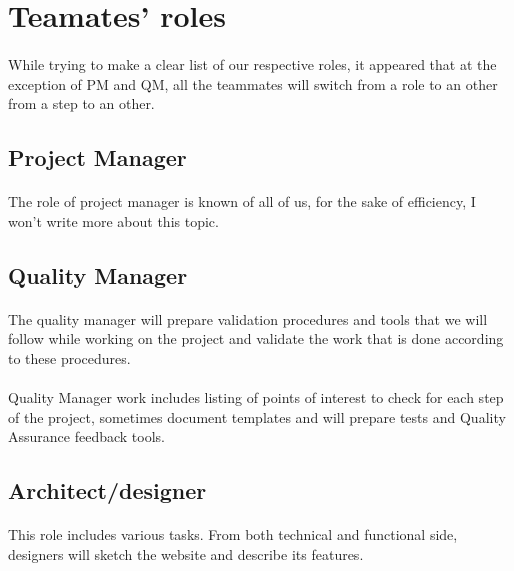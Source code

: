 \section{Teamates' roles}

\paragraph{} While trying to make a clear list of our respective roles, it
appeared that at the exception of PM and QM, all the teammates will switch from a
role to an other from a step to an other.

\subsection{Project Manager}

\paragraph{} The role of project manager is known of all of us, for the sake of
efficiency, I won't write more about this topic.

\subsection{Quality Manager}

\paragraph{} The quality manager will prepare validation procedures and tools
that we will follow while working on the project and validate the work that is
done according to these procedures.

\paragraph{} Quality Manager work includes listing of points of interest to
check for each step of the project, sometimes document templates and will
prepare tests and Quality Assurance feedback tools.

\subsection{Architect/designer}

\paragraph{} This role includes various tasks. From both technical and
functional side, designers will sketch the website and describe its features.

